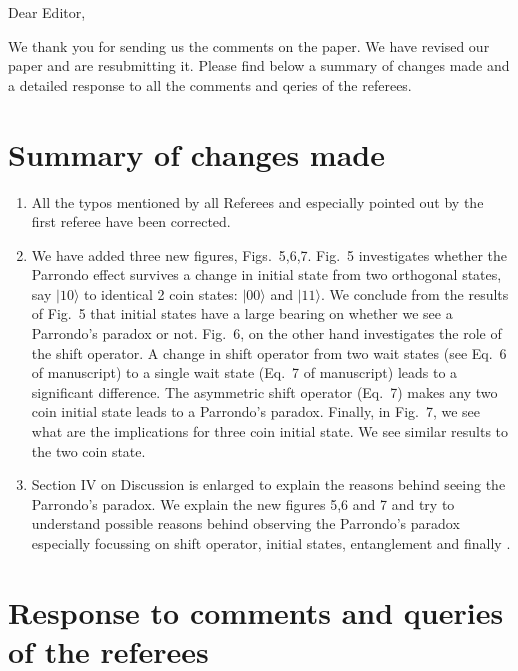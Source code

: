 \documentclass[10pt,a4paper]{article}
\begin{document}
\begin{flushleft}
Dear Editor,
\end{flushleft}

We thank you for sending us the comments on the paper. We have revised our paper and are resubmitting it. Please find below a summary of changes made and a detailed response to all the comments and qeries of the referees. 
\section*{Summary of changes made}
\begin{enumerate}
\item All the typos mentioned by all Referees and especially pointed out by the first referee have been corrected.

\item We have added three new figures, Figs.~5,6,7. Fig.~5 investigates whether the Parrondo effect survives a change in initial state from two orthogonal states, say $|10\rangle$ to identical 2 coin states: $|00\rangle$ and $|11\rangle$. We conclude from the results of Fig.~5 that initial states have a large bearing on whether we see a Parrondo's paradox or not. Fig.~6, on the other hand investigates the role of the shift operator. A change in shift operator from two wait states (see Eq.~6 of manuscript) to a single wait state (Eq.~7 of manuscript) leads to a significant difference. The asymmetric shift operator (Eq.~7) makes any two coin initial state leads to a Parrondo's paradox. Finally, in Fig.~7, we see what are the implications for three coin initial state. We see similar results to the two coin state.

\item Section IV on Discussion is enlarged to explain the reasons behind seeing the Parrondo's paradox. We explain the new figures 5,6 and 7 and try to understand possible reasons behind observing the Parrondo's paradox especially focussing on shift operator, initial states, entanglement and finally .

\end{enumerate}

\section*{Response to comments and queries of the referees}
\end{document}
